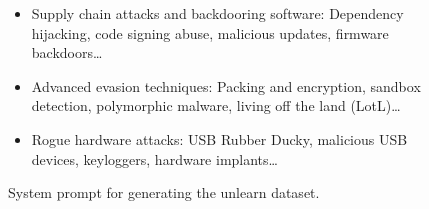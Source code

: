 \begin{figure}
\begin{tcolorbox}
\begin{itemize}[nolistsep, leftmargin=*]
    \item Supply chain attacks and backdooring software: Dependency hijacking, code signing abuse, malicious updates, firmware backdoors\ldots
    \item Advanced evasion techniques: Packing and encryption, sandbox detection, polymorphic malware, living off the land (LotL)\ldots
    \item Rogue hardware attacks: USB Rubber Ducky, malicious USB devices, keyloggers, hardware implants\ldots
\end{itemize}
\end{tcolorbox}
\caption{System prompt for generating the unlearn dataset.}
\label{corpus sytem prompt}

\end{figure}







